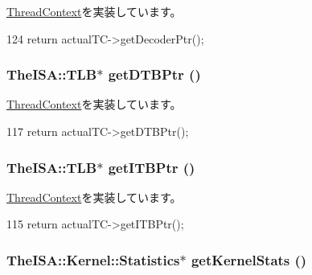 \hyperlink{classThreadContext_a14aa0e2adc88b9bc615f708aad02d80f}{ThreadContext}を実装しています。


\begin{DoxyCode}
124 { return actualTC->getDecoderPtr(); }
\end{DoxyCode}
\hypertarget{classCheckerThreadContext_a2fe6a07c44bc2a4d83b86bea605ba971}{
\subsubsection[{getDTBPtr}]{\setlength{\rightskip}{0pt plus 5cm}TheISA::TLB$\ast$ getDTBPtr ()}}
\label{classCheckerThreadContext_a2fe6a07c44bc2a4d83b86bea605ba971}


\hyperlink{classThreadContext_a235a0443e22590632cfc95cd4f6db1ae}{ThreadContext}を実装しています。


\begin{DoxyCode}
117 { return actualTC->getDTBPtr(); }
\end{DoxyCode}
\hypertarget{classCheckerThreadContext_a95b7e95d0558cd03d69613142fff9137}{
\subsubsection[{getITBPtr}]{\setlength{\rightskip}{0pt plus 5cm}TheISA::TLB$\ast$ getITBPtr ()}}
\label{classCheckerThreadContext_a95b7e95d0558cd03d69613142fff9137}


\hyperlink{classThreadContext_aaae22e0dcf2f312619915bbf34509ba4}{ThreadContext}を実装しています。


\begin{DoxyCode}
115 { return actualTC->getITBPtr(); }
\end{DoxyCode}
\hypertarget{classCheckerThreadContext_a3faa5e314c06241296ab582bb891a06a}{
\subsubsection[{getKernelStats}]{\setlength{\rightskip}{0pt plus 5cm}TheISA::Kernel::Statistics$\ast$ getKernelStats ()}}
\label{classCheckerThreadContext_a3faa5e314c06241296ab582bb891a06a}


